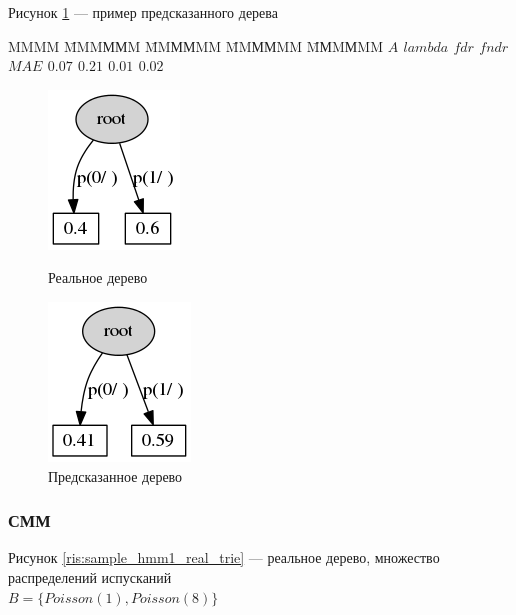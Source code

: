 \documentclass{matmex-diploma-custom}
\begin{document}
Рисунок \ref{ris:sample_mixture_predicted_trie} --- пример предсказанного дерева
\begin{tabbing}
MMMM \= MMMММM \= MMММMM \= MMММMM \= MМMМMM\kill
\bf{}  \> {\bf $\textit{A}$} \> {\bf $\textit{lambda}$} \> {\bf $\textit{fdr}$} \> {\bf $\textit{fndr}$}  \\ 
$\textit{MAE}$ \> $0.07$ \> $0.21$ \> $0.01$ \> $0.02$ \
\end{tabbing}
\begin{figure}[h!]\centering
\begin{minipage}[b]{0.49 \textwidth}
	\includegraphics[scale=0.57]{img/sample_mixture/real_trie_.png}
	\centering
	\caption{ Реальное дерево }
	\label{ris:sample_mixture_real_trie}
	
\end{minipage}
\hfil \hfil%
\begin{minipage}[b]{0.49 \textwidth}
	\includegraphics[scale=0.57]{img/sample_mixture/predicted_trie.png}
	\centering
	\caption{ Предсказанное дерево }
	\label{ris:sample_mixture_predicted_trie}
\end{minipage}
\end{figure}

\subsubsection{СММ}
Рисунок \ref{ris:sample_hmm1_real_trie} --- реальное дерево, множество распределений испусканий 
\\$B = \{\textit{Poisson}(1), \textit{Poisson}(8)\}$ 
\end{document}
